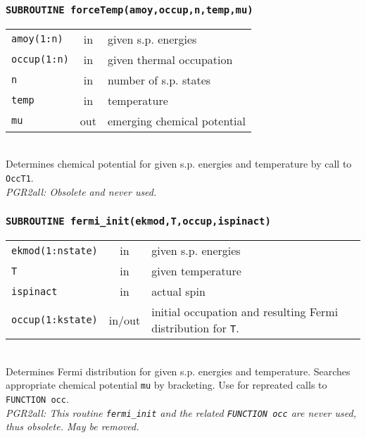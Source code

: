\documentclass[final,1p]{elsarticle}
\newcommand{\PGRcomm}[1]{{\color{blue}\small\em PGR2all: #1}}
\begin{document}
\subsubsection*{\tt SUBROUTINE forceTemp(amoy,occup,n,temp,mu)}
\begin{tabular}{lcl}
 {\tt amoy(1:n)} & in & given s.p. energies\\
 {\tt occup(1:n)} & in & given thermal occupation\\
 {\tt n} & in & number of s.p. states\\
 {\tt temp} & in & temperature\\
 {\tt mu} & out & emerging chemical potential\\
\end{tabular}
\\[4pt]
Determines chemical potential for given s.p. energies and temperature
by call to {\tt OccT1}.
\\
\PGRcomm{Obsolete and never used.}




\subsubsection*{\tt SUBROUTINE fermi\_init(ekmod,T,occup,ispinact)}
\begin{tabular}{lcl}
 {\tt ekmod(1:nstate)} & in & given s.p. energies\\
 {\tt T} & in & given temperature\\
 {\tt ispinact} & in & actual spin\\
 {\tt occup(1:kstate)} & in/out & initial occupation and resulting
 Fermi distribution for {\tt T}.\\
\end{tabular}
\\[4pt]
Determines Fermi distribution for given s.p. energies and
temperature. Searches appropriate chemical potential {\tt mu} by
bracketing. Use for repreated calls to {\tt FUNCTION occ}.
\\
\PGRcomm{This routine {\tt fermi\_init} and the related
{\tt FUNCTION occ} are never used, thus obsolete. May be removed.}
\end{document}
